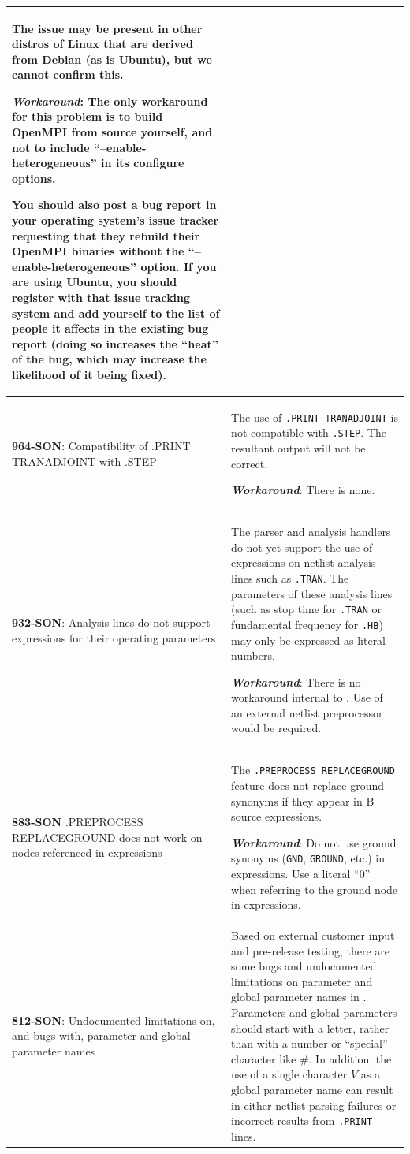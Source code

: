 {\begin{longtable}[h] {>{\raggedright\small}m{2in}|>{\raggedright\let\\\tabularnewline\small}m{3.5in}}
The issue may be present in other distros of Linux that are derived
from Debian (as is Ubuntu), but we cannot confirm this.

\textbf{\textit{Workaround}}:
The only workaround for this problem is to build OpenMPI from source
yourself, and not to include ``--enable-heterogeneous'' in its
configure options.

You should also post a bug report in your operating system's issue
tracker requesting that they rebuild their OpenMPI binaries without
the ``--enable-heterogeneous'' option.  If you are using Ubuntu, you
should register with that issue tracking system and add yourself to
the list of people it affects in the existing bug report (doing so
increases the ``heat'' of the bug, which may increase the likelihood
of it being fixed).

\\ \hline

\textbf{964-SON}: Compatibility of .PRINT TRANADJOINT with .STEP & The use of
\texttt{.PRINT TRANADJOINT} is not compatible with \texttt{.STEP}.  The
resultant \Xyce{} output will not be correct.

\textbf{\textit{Workaround}}: There is none.
\\ \hline

\textbf{932-SON}: Analysis lines do not support expressions for their
operating parameters & The \Xyce{} parser and analysis handlers do not
yet support the use of expressions on netlist analysis lines such
as \texttt{.TRAN}.  The parameters of these analysis lines (such as
stop time for \texttt{.TRAN} or fundamental frequency
for \texttt{.HB}) may only be expressed as literal numbers.

\textbf{\textit{Workaround}}: There is no workaround internal to \Xyce{}.
Use of an external netlist preprocessor would be required. \\ \hline

\textbf{883-SON} .PREPROCESS REPLACEGROUND does not work on nodes referenced
in expressions & The \texttt{.PREPROCESS REPLACEGROUND} feature does
not replace ground synonyms if they appear in B source expressions.

\textbf{\textit{Workaround}}: Do not use ground synonyms (\texttt{GND},
\texttt{GROUND}, etc.) in expressions.  Use a literal ``0'' when
referring to the ground node in expressions.\\ \hline

\textbf{812-SON}: Undocumented limitations on, and bugs with, parameter and
global parameter names & Based on external customer input and
pre-release testing, there are some bugs and undocumented limitations
on parameter and global parameter names in
\Xyce{}. Parameters and global parameters should start with a letter, rather
than with a number or ``special'' character like \#.  In addition, the
use of a single character $V$ as a global parameter name can result in
either netlist parsing failures or incorrect results
from \texttt{.PRINT} lines.  \\ \hline


\end{longtable}}
